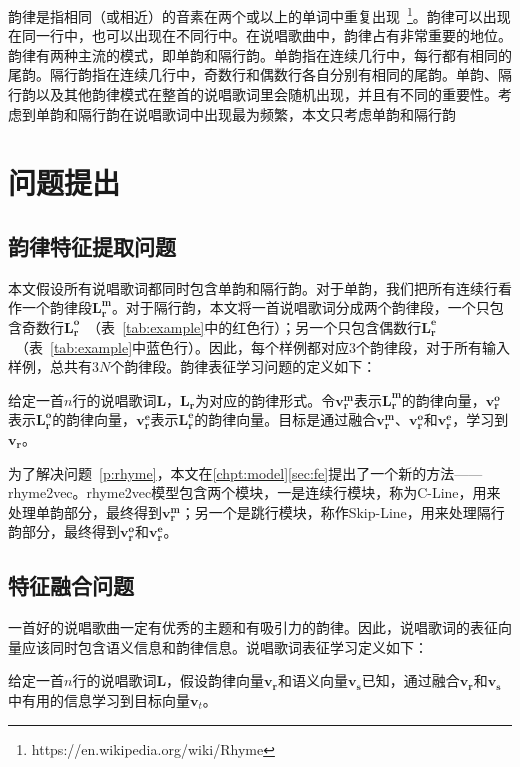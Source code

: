 \par

韵律是指相同（或相近）的音素在两个或以上的单词中重复出现~\footnote{https://en.wikipedia.org/wiki/Rhyme}。韵律可以出现在同一行中，也可以出现在不同行中。在说唱歌曲中，韵律占有非常重要的地位。韵律有两种主流的模式，即单韵和隔行韵。单韵指在连续几行中，每行都有相同的尾韵。隔行韵指在连续几行中，奇数行和偶数行各自分别有相同的尾韵。单韵、隔行韵以及其他韵律模式在整首的说唱歌词里会随机出现，并且有不同的重要性。考虑到单韵和隔行韵在说唱歌词中出现最为频繁，本文只考虑单韵和隔行韵\par

\section {问题提出}
\subsection{韵律特征提取问题}
本文假设所有说唱歌词都同时包含单韵和隔行韵。对于单韵，我们把所有连续行看作一个韵律段$\bm {L_{r}^{m}}$。对于隔行韵，本文将一首说唱歌词分成两个韵律段，一个只包含奇数行$\bm {L_{r}^{o}}$~（表~\ref{tab:example}中的红色行）；另一个只包含偶数行$\bm {L_{r}^{e}}$~（表~\ref{tab:example}中蓝色行）。因此，每个样例都对应3个韵律段，对于所有输入样例，总共有$3N$个韵律段。韵律表征学习问题的定义如下：
\begin{mydef}
  \label{p:rhyme}
  给定一首$n$行的说唱歌词$\bm L$，$\bm {L_r}$为对应的韵律形式。令$\bm {v_{r}^{m}}$表示$\bm {L_r^{m}}$的韵律向量，$\bm {v_{r}^{o}}$表示$\bm {L_r^{o}}$的韵律向量，$\bm {v_{r}^{e}}$表示$\bm {L_r^{e}}$的韵律向量。目标是通过融合$\bm {v_{r}^{m}}$、$\bm {v_{r}^{o}}$和$\bm {v_{r}^{e}}$，学习到$\bm {v_r}$。
\end{mydef}
\par

为了解决问题~\ref{p:rhyme}，本文在{\ref{chpt:model}\ref{sec:fe}}提出了一个新的方法——rhyme2vec。rhyme2vec模型包含两个模块，一是连续行模块，称为C-Line，用来处理单韵部分，最终得到$\bm {v_{r}^{m}}$；另一个是跳行模块，称作Skip-Line，用来处理隔行韵部分，最终得到$\bm {v_{r}^{o}}$和$\bm {v_{r}^{e}}$。\par

\subsection{特征融合问题}
一首好的说唱歌曲一定有优秀的主题和有吸引力的韵律。因此，说唱歌词的表征向量应该同时包含语义信息和韵律信息。说唱歌词表征学习定义如下：
\begin{mydef}
  \label{p:all}
  给定一首$n$行的说唱歌词$\bm L$，假设韵律向量$\bm {v_r}$和语义向量$\bm {v_s}$已知，通过融合$\bm {v_r}$和$\bm {v_s}$中有用的信息学习到目标向量$\bm v_t$。
\end{mydef}
\par

